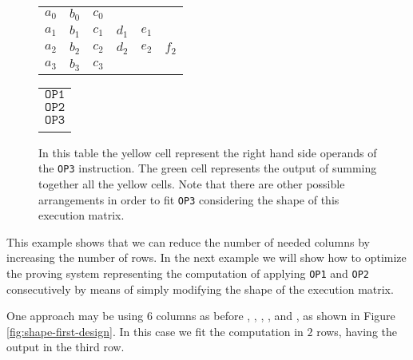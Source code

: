 \begin{figure}[H]
\centering

\begin{tabular}{|c|c|c|c|c|c|}
\hline
\A & \B & \C & \D & \E & \F \\ \hline
$a_0$ & $b_0$ & $c_0$ & & &\\ \hline
$a_1$ & $b_1$ & $c_1$ & $d_1$ & $e_1$ & \\ \hline
\cellcolor{yellow} $a_2$ & \cellcolor{yellow} $b_2$ & \cellcolor{yellow}  $c_2$ & \cellcolor{yellow} $d_2$ & \cellcolor{yellow} $e_2$ & \cellcolor{yellow} $f_2$ \\ \hline
\cellcolor{green} $a_3$ & \cellcolor{yellow}  $b_3$ & \cellcolor{yellow}  $c_3$ &&& \\ \hline
\end{tabular}
\hspace{1em}
\begin{tabular}{c}
\\
$\mathtt{OP1}$ \\
$\mathtt{OP2}$ \\
$\mathtt{OP3}$ \\
$             $ \\
\end{tabular}

\caption{In this table the yellow cell represent the right hand side operands of the \texttt{OP3} instruction. The green cell represents the output of summing together all the yellow cells. Note that there are other possible arrangements in order to fit \texttt{OP3} considering the shape of this execution matrix. }
\label{fig:op3}

\end{figure}


This example shows that we can reduce the number of needed columns by increasing the number of rows. In the next example we will show how to optimize the proving system representing the computation of applying \texttt{OP1} and \texttt{OP2} consecutively by means of simply modifying the shape of the execution matrix.

One approach may be using $6$ columns as before \A, \B, \C, \D, \E and \F, as shown in Figure \ref{fig:shape-first-design}. In this case we fit the computation in $2$ rows, having the output in the third row.


